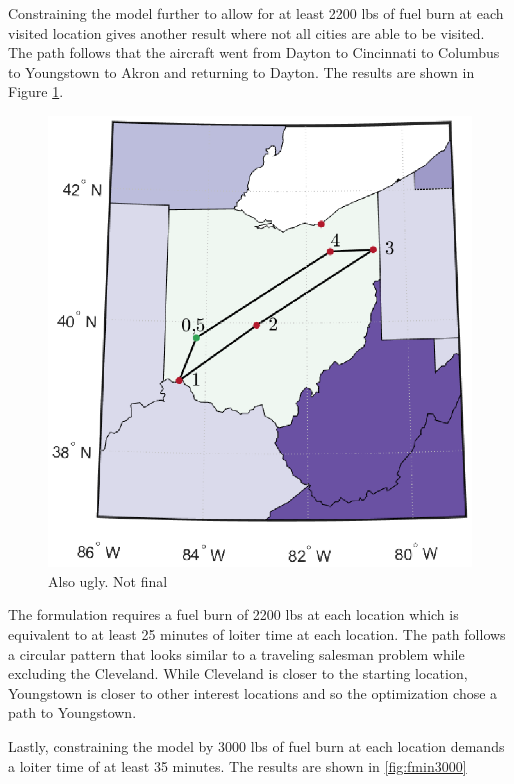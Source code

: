 Constraining the model further to allow for at least 2200 lbs of fuel burn at each visited location gives another result where not all cities are able to be visited. The path follows that the aircraft went from Dayton to Cincinnati to Columbus to Youngstown to Akron and returning to Dayton. The results are shown in Figure \ref{fig:fmin2200}.
\begin{figure}[H]
    \centering
    \includegraphics{Thesis/Method_II/fmin2200.eps}
    \caption{Also ugly. Not final}
    \label{fig:fmin2200}
\end{figure}
The formulation requires a fuel burn of 2200 lbs at each location which is equivalent to at least 25 minutes of loiter time at each location. The path follows a circular pattern that looks similar to a traveling salesman problem while excluding the Cleveland. While Cleveland is closer to the starting location, Youngstown is closer to other interest locations and so the optimization chose a path to Youngstown.\par
Lastly, constraining the model by 3000 lbs of fuel burn at each location demands a loiter time of at least 35 minutes. The results are shown in \ref{fig:fmin3000}
